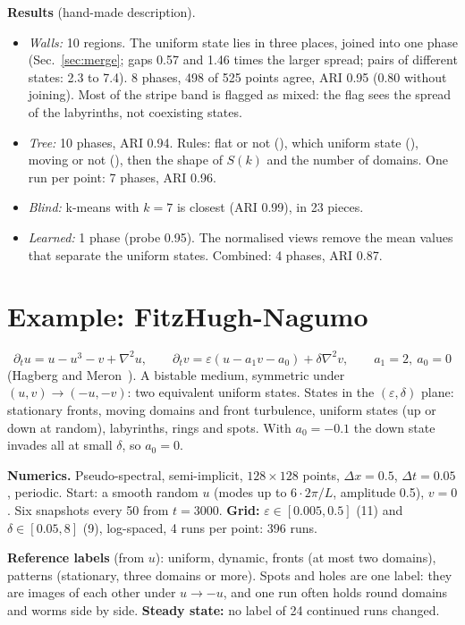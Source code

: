 \documentclass[11pt,a4paper]{article}
\newcommand{\code}[1]{\texttt{\detokenize{#1}}}
\begin{document}
\begin{tech}
\textbf{Results} (hand-made description).
\begin{itemize}[leftmargin=1.2em, itemsep=1pt]
\item \emph{Walls:} 10 regions. The uniform state lies in three places, joined into one phase
  (Sec.~\ref{sec:merge}; gaps 0.57 and 1.46 times the larger spread; pairs of different states:
  2.3 to 7.4). 8 phases, 498 of 525 points agree, ARI 0.95 (0.80 without joining). Most of the
  stripe band is flagged as mixed: the flag sees the spread of the labyrinths, not coexisting
  states.
\item \emph{Tree:} 10 phases, ARI 0.94. Rules: flat or not (\code{u.amp.log10var}), which uniform
  state (\code{u.mom.mean}), moving or not (\code{u.dyn.moving}), then the shape of $S(k)$ and the
  number of domains. One run per point: 7 phases, ARI 0.96.
\item \emph{Blind:} k-means with $k=7$ is closest (ARI 0.99), in 23 pieces.
\item \emph{Learned:} 1 phase (probe 0.95). The normalised views remove the mean values that
  separate the uniform states. Combined: 4 phases, ARI 0.87.
\end{itemize}
\end{tech}

\section{Example: FitzHugh-Nagumo}\label{sec:fhn}

\begin{tech}
\[
\partial_tu=u-u^3-v+\nabla^2u,\qquad \partial_tv=\varepsilon(u-a_1v-a_0)+\delta\nabla^2v,
\qquad a_1=2,\ a_0=0
\]
(Hagberg and Meron~\cite{hagberg1994}). A bistable medium, symmetric under $(u,v)\to(-u,-v)$: two
equivalent uniform states. States in the $(\varepsilon,\delta)$ plane: stationary fronts, moving
domains and front turbulence, uniform states (up or down at random), labyrinths, rings and spots.
With $a_0=-0.1$ the down state invades all at small $\delta$, so $a_0=0$.

\textbf{Numerics.} Pseudo-spectral, semi-implicit, $128\times128$ points, $\Delta x=0.5$,
$\Delta t=0.05$, periodic. Start: a smooth random $u$ (modes up to $6\cdot2\pi/L$, amplitude 0.5),
$v=0$. Six snapshots every 50 from $t=3000$. \textbf{Grid:} $\varepsilon\in[0.005,0.5]$ (11) and
$\delta\in[0.05,8]$ (9), log-spaced, 4 runs per point: 396 runs.

\textbf{Reference labels} (from $u$): uniform, dynamic, fronts (at most two domains), patterns
(stationary, three domains or more). Spots and holes are one label: they are images of each other
under $u\to-u$, and one run often holds round domains and worms side by side. \textbf{Steady state:} no label of 24 continued runs changed.
\end{tech}
\end{document}
